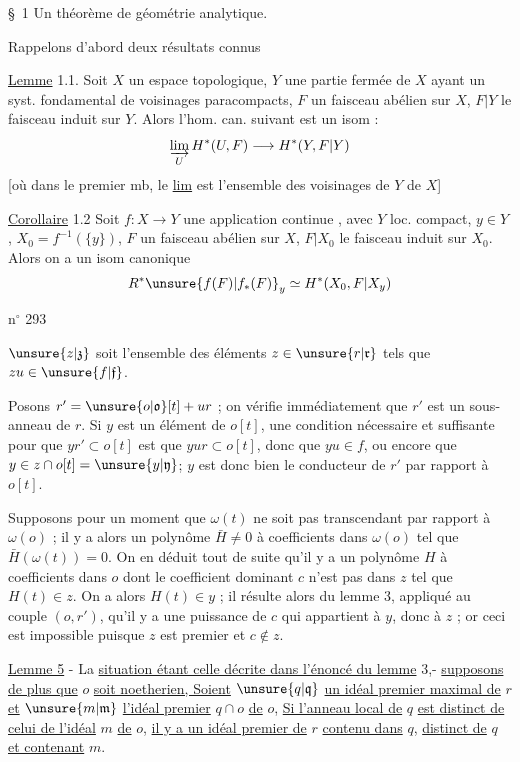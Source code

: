 
\S\ 1 Un théorème de géométrie analytique.

Rappelons d'abord deux résultats connus

\uline{Lemme} 1.1. Soit $X$ un espace topologique, $Y$ une partie fermée de $X$ ayant un syst. fondamental de voisinages paracompacts, $F$ un faisceau abélien sur $X$, $F|Y$ le faisceau induit sur $Y$. Alors l'hom. can.  suivant est un isom :
\[
\varinjlim_U H^*(U,F)\longrightarrow H^*(Y,F|Y)
\]
[où dans le premier mb, le \uline{lim} est  l'ensemble des voisinages de $Y$ de $X$]

\uline{Corollaire} 1.2 Soit $f:X\longrightarrow Y$ une application continue , avec $Y$ loc. compact,  $y\in Y$, $X_0=f^{-1}(\{y\})$, $F$ un faisceau abélien sur $X$, $F|X_0$ le faisceau induit sur $X_0$. Alors on a un isom canonique
\[
R^*\unsure{f(F)|f_*(F)}_y\simeq H^*(X_0,F|X_y)
\]

\hfill n$^\circ$ 293

$\unsure{z|\mathfrak z}$ soit l'ensemble des éléments $z\in\unsure{r|\mathfrak r}$ tels que $zu\in\unsure{f|\mathfrak f}$.

Posons $r'=\unsure{o|\mathfrak o}[t]+ur$ ; on vérifie immédiatement que $r'$ est un sous-anneau de $r$. Si $y$ est un élément de $o[t]$, une condition nécessaire et suffisante pour que $yr'\subset o[t]$ est que $yur\subset o[t]$, donc que $yu\in f$, ou encore que $y\in z\cap o[t]=\unsure{y|\mathfrak y}$; $y$ est donc bien le conducteur de $r'$ par rapport à $o[t]$.

Supposons pour un moment que $\omega(t)$ ne soit pas transcendant par rapport à $\omega(o)$ ; il y a alors un polynôme $\bar H\ne0$ à coefficients dans $\omega(o)$ tel que $\bar H(\omega(t))=0$. On en déduit tout de suite qu'il y a un polynôme $H$ à coefficients dans $o$ dont le coefficient dominant $c$ n'est pas dans $z$ tel que $H(t)\in z$. On a alors $H(t)\in y$ ; il résulte alors du lemme 3, appliqué au couple $(o,r')$, qu'il y a une puissance de $c$ qui appartient à $y$, donc à $z$ ; or ceci est impossible puisque $z$ est premier et $c\notin z$.

\uline{Lemme 5} - La \uline{situation étant celle décrite dans l'énoncé du lemme} 3,- \uline{supposons de plus que} $o$ \uline{soit noetherien, Soient} $\unsure{q|\mathfrak q}$ \uline{un idéal premier maximal de} $r$ \uline{et} $\unsure{m|\mathfrak m}$ \uline{l'idéal premier} $q\cap o$ \uline{de} $o$, \uline{Si l'anneau local de} $q$ \uline{est distinct de celui de l'idéal} $m$ \uline{de} $o$, \uline{il y a un idéal premier de} $r$ \uline{contenu dans} $q$, \uline{distinct de} $q$ \uline{et contenant} $m$.

